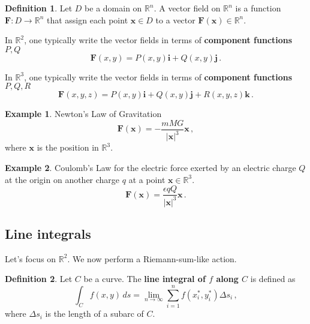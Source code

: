 \documentclass[
]{article}
\theoremstyle{definition}
\newtheorem{definition}{Definition}[section]
\theoremstyle{definition}
\newtheorem{example}{Example}[section]
\theoremstyle{definition}
\theoremstyle{definition}
\theoremstyle{remark}
\begin{document}
\begin{definition}
Let \(D\) be a domain on \(\mathbb{R}^n\).
A vector field on \(\mathbb{R}^n\) is a function \(\mathbf{F}: D \to \mathbb{R}^n\)
that assign each point \(\mathbf{x}\in D\) to a vector \(\mathbf{F}(\mathbf{x}) \in \mathbb{R}^n\).
\end{definition}

In \(\mathbb{R}^2\), one typically write the vector fields in terms of \textbf{component functions} \(P, Q\)
\[\mathbf{F}(x,y) = P(x,y) \mathbf{i} + Q(x,y) \mathbf{j}\,.\]

In \(\mathbb{R}^3\), one typically write the vector fields in terms of \textbf{component functions} \(P, Q, R\)
\[\mathbf{F}(x,y,z) = P(x,y) \mathbf{i} + Q(x,y) \mathbf{j} + R(x,y,z) \mathbf{k}\,.\]

\begin{example}
Newton's Law of Gravitation
\begin{equation*}
    \mathbf{F}(\mathbf{x}) = - \frac{m M G}{| \mathbf{x}|^3 } \mathbf{x} \,,
\end{equation*}
where \(\mathbf{x}\) is the position in \(\mathbb{R}^3\).
\end{example}

\begin{example}
Coulomb's Law for the electric force exerted by an electric charge \(Q\)
at the origin on another charge \(q\) at a point \(\mathbf{x}\in \mathbb{R}^3\).
\begin{equation*}
    \mathbf{F}(\mathbf{x}) = \frac{ \epsilon q Q}{|\mathbf{x}|^3} \mathbf{x} \,.
\end{equation*}
\end{example}

\subsection{Line integrals}\label{line-integrals}

Let's focus on \(\mathbb{R}^2\).
We now perform a Riemann-sum-like action.

\begin{definition}
Let \(C\) be a curve.
The \textbf{line integral of \(f\) along \(C\)} is defined as
\begin{equation*}
    \int_C f(x,y) \, ds = \lim_{n\to \infty} \sum_{i=1}^n f(x_i^*, y_i^*) \Delta s_i \,,
\end{equation*}
where \(\Delta s_i\) is the length of a subarc of \(C\).
\end{definition}
\end{document}

